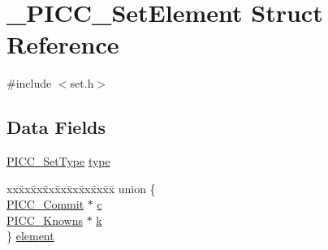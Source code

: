 \hypertarget{struct__PICC__SetElement}{\section{\-\_\-\-P\-I\-C\-C\-\_\-\-Set\-Element Struct Reference}
\label{struct__PICC__SetElement}
}


{\ttfamily \#include $<$set.\-h$>$}

\subsection*{Data Fields}
\begin{DoxyCompactItemize}
\item 
\hyperlink{set_8h_a4b6452c366a4ad94e2d44482416e70ce}{P\-I\-C\-C\-\_\-\-Set\-Type} \hyperlink{struct__PICC__SetElement_a4fc25820ff4efe2603a2889a2b9999ef}{type}
\item 
\begin{tabbing}
xx\=xx\=xx\=xx\=xx\=xx\=xx\=xx\=xx\=\kill
union \{\\
\>\hyperlink{commit_8h_a655097bbaf0e81713b6d9336948c211c}{PICC\_Commit} $\ast$ \hyperlink{struct__PICC__SetElement_a96b268d1a7db23c6c8c6d3e0ff8e5ebb}{c}\\
\>\hyperlink{channel_8h_a87609417467916d98a7505871adc1760}{PICC\_Knowns} $\ast$ \hyperlink{struct__PICC__SetElement_a5d751b689a48e4cc3db2711a1a496f24}{k}\\
\} \hyperlink{struct__PICC__SetElement_a3ed4936810d7358e75a062e5e17fa26e}{element}\\

\end{tabbing}\end{DoxyCompactItemize}


